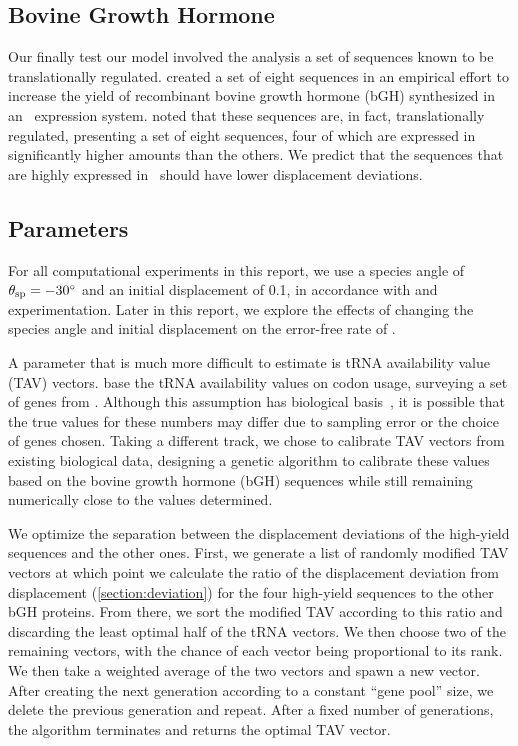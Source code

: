\documentclass[12pt]{article}
\numberwithin{equation}{section}
\begin{document}
\subsection{Bovine Growth Hormone}
Our finally test our model involved the analysis a set of sequences known to be translationally 
regulated.  \citet{schoner:bgh} created a set of eight sequences in an empirical effort
to increase the yield of recombinant bovine growth hormone (bGH) 
synthesized in an \ecoli\ expression system. \citeauthor{schoner:bgh}
noted that these sequences are, in fact, translationally regulated, 
presenting a set of eight sequences, four of which
are expressed in significantly higher amounts than the others.
We predict that the sequences that are highly expressed in
\ecoli\ should have lower displacement deviations.

\subsection{Parameters}
\label{section:parameters}
For all computational experiments in this report, we use a species
angle of $\theta_{\rm{sp}} = -30^\circ$ and an initial displacement of 0.1,
in accordance with \citet{lalit:mechanics} and experimentation.
Later in this report, we explore
the effects of changing the species angle and initial displacement on the
error-free rate of \prfB.

A parameter that is much more difficult to estimate
is tRNA availability value (TAV) vectors.
\citeauthor{lalit:mechanics} base the tRNA availability values on codon usage, 
surveying a set of genes from \ecoli.
Although this assumption has biological basis~\cite{ikemura}, 
it is possible that the true values for these numbers may differ 
due to sampling error or the choice of genes chosen.
Taking a different track, we chose to calibrate TAV vectors from
existing biological data, designing a genetic algorithm to calibrate
these values based on the bovine growth hormone (bGH) sequences
while still remaining numerically close to the values
\citeauthor{lalit:mechanics} determined.

We optimize the separation between the displacement deviations of the 
high-yield sequences and the other ones.  
First, we generate a list of randomly modified TAV vectors at which
point we calculate the ratio of the displacement deviation from
displacement (\autoref{section:deviation}) for the four high-yield 
sequences to the other bGH proteins. From there, we sort the 
modified TAV according to this ratio and discarding the least 
optimal half of the tRNA vectors. We then choose two of the 
remaining vectors, with the chance of each vector being proportional
 to its rank.  We then take a weighted average of the two vectors 
 and spawn a new vector.  After creating the next generation according 
 to a constant ``gene pool'' size, we delete the previous generation 
 and repeat. After a fixed number of generations, the algorithm 
 terminates and returns the optimal TAV vector.
\end{document}
